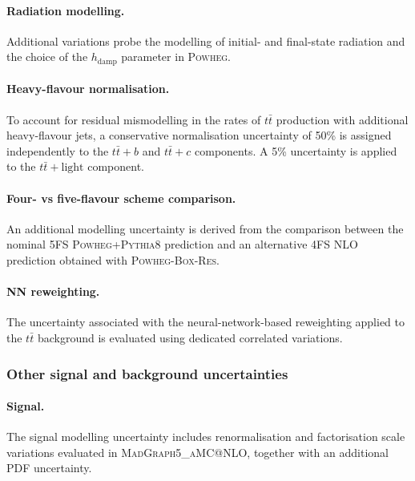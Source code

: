 \paragraph{Radiation modelling.}

Additional variations probe the modelling of initial- and final-state radiation and the choice of the $h_{\mathrm{damp}}$ parameter in \textsc{Powheg}.

\paragraph{Heavy-flavour normalisation.}

To account for residual mismodelling in the rates of $t\bar{t}$ production with additional heavy-flavour jets, a conservative normalisation uncertainty of 50\% is assigned independently to the $t\bar{t}+b$ and $t\bar{t}+c$ components.
A 5\% uncertainty is applied to the $t\bar{t}+\mathrm{light}$ component.

\paragraph{Four- vs five-flavour scheme comparison.}

An additional modelling uncertainty is derived from the comparison between the nominal 5FS \textsc{Powheg}+\textsc{Pythia8} prediction and an alternative 4FS NLO prediction obtained with \textsc{Powheg-Box}\allowbreak-\textsc{Res}.

\paragraph{NN reweighting.}

The uncertainty associated with the neural-network-based reweighting applied to the $t\bar{t}$ background is evaluated using dedicated correlated variations.

\hfil

\subsubsection{Other signal and background uncertainties}

\paragraph{\textbf{\boldmath Signal.}}

The signal modelling uncertainty includes renormalisation and factorisation scale variations evaluated in \textsc{MadGraph5\_aMC@NLO}, together with an additional PDF uncertainty.

